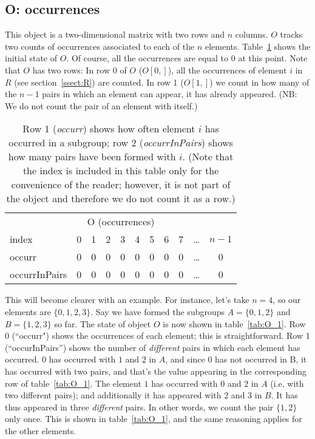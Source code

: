 \documentclass[a4paper]{article}
\begin{document}
\subsection{O: occurrences}
\label{ssec:occurr}

This object is a two-dimensional matrix with two rows and $n$ columns.
$O$ tracks two counts of occurrences associated to each of the $n$ elements.
Table~\ref{tab:O_0} shows the initial state of $O$.
Of course, all the occurrences are equal to $0$ at this point.
Note that $O$ has two rows:
In row 0 of $O$ ($O[0,]$), all the occurrences of element $i$ in $R$ (see section~\ref{ssect:R}) are counted.
In row 1 ($O[1,]$) we count in how many of the $n-1$ pairs in which an element can appear, it has already appeared.
(NB: We do not count the pair of an element with itself.)

\begin{table}
\centering
\begin{tabular} {| l ||c |c |c |c |c |c |c |c |c |c |}  
\multicolumn{ 11 }{c}{O (occurrences) } \\  
\multicolumn{1}{l}{index} & \multicolumn{1}{c}{0} & \multicolumn{1}{c}{1} & \multicolumn{1}{c}{2} & \multicolumn{1}{c}{3} & \multicolumn{1}{c}{4} & \multicolumn{1}{c}{5} & \multicolumn{1}{c}{6} & \multicolumn{1}{c}{7} & \multicolumn{1}{c}{\ldots} & \multicolumn{1}{c}{$n-1$} \\ \hline 
occurr & 0 & 0 & 0 & 0 & 0 & 0 & 0 & 0 & \ldots & 0 \\ \hline 
occurrInPairs & 0 & 0 & 0 & 0 & 0 & 0 & 0 & 0 & \ldots & 0 \\ \hline 
\end{tabular}  
\caption{
Row 1 (\emph{occurr}) shows how often element $i$ has occurred in a subgroup;
row 2 (\emph{occurrInPairs}) shows how many pairs have been formed with $i$.
(Note that the index is included in this table only for the convenience of the reader; however, it is not part of the object and therefore we do not count it as a row.)
}
\label{tab:O_0}
\end{table}

This will become clearer with an example.
For instance, let's take $n=4$, so our elements are $\{0,1,2,3\}$.
Say we have formed the subgroups $A=\{0,1,2\}$ and $B=\{1,2,3\}$ so far.
The state of object $O$ is now shown in table~\ref{tab:O_1}.
Row 0 (``occurr") shows the occurrences of each element; this is straightforward.
Row 1 (``occurInPairs'') shows the number of \emph{different} pairs in which each element has occurred.
$0$ has occurred with $1$ and $2$ in $A$, and since $0$ has not occurred in B, it has occurred with two pairs, and that's the value appearing in the corresponding row of table~\ref{tab:O_1}.
The element $1$ has occurred with $0$ and $2$ in $A$ (i.e. with two different pairs); and additionally it has appeared with $2$ and $3$ in $B$.
It has thus appeared in three \emph{different} pairs.
In other words, we count the pair $\{1,2\}$ only once.
This is shown in table~\ref{tab:O_1}, and the same reasoning applies for the other elements.
\end{document}
